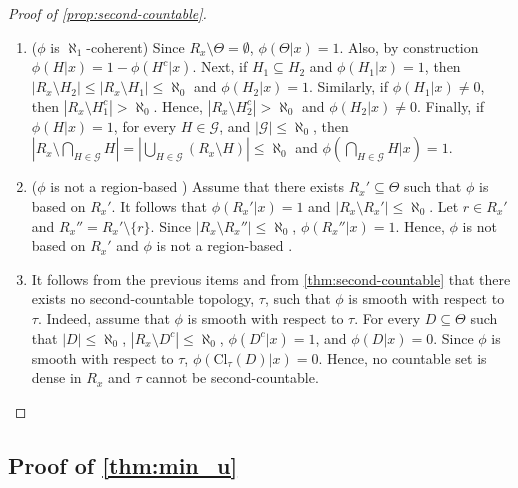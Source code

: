 \begin{proof}[Proof of \cref{prop:second-countable}]
 \begin{enumerate}
  \item ($\phi$ is $\aleph_1$-coherent) Since $R_x \setminus \Theta = \emptyset$, $\phi(\Theta|x) = 1$. Also, by construction $\phi(H|x) = 1 - \phi(H^c|x)$. Next, if $H_1 \subseteq H_2$ and $\phi(H_1|x) = 1$, then $|R_x \setminus H_2| \leq |R_x \setminus H_1| \leq \aleph_0$ and $\phi(H_2|x) = 1$. Similarly, if $\phi(H_1|x) \neq 0$, then $|R_x \setminus H_1^c| > \aleph_0$. Hence, $|R_x \setminus H_2^c| > \aleph_0$ and $\phi(H_2|x) \neq 0$. Finally, if $\phi(H|x) = 1$, for every $H \in \mathcal{G}$, and $|\mathcal{G}| \leq \aleph_0$, then $|R_x \setminus \bigcap_{H \in \mathcal{G}}H| = |\bigcup_{H \in \mathcal{G}}(R_x \setminus H)| \leq \aleph_0$ and $\phi(\bigcap_{H \in \mathcal{G}}H|x) = 1$.

  \item ($\phi$ is not a region-based \summ) Assume that there exists $R_x' \subseteq \Theta$ such that $\phi$ is based on $R_x'$. It follows that $\phi(R_x'|x) = 1$ and $|R_x \setminus R_x'| \leq \aleph_0$. Let $r \in R_x'$ and $R_x'' = R_x' \setminus \{r\}$. Since $|R_x \setminus R_x''| \leq \aleph_0$, $\phi(R_x''|x) = 1$. Hence, $\phi$ is not based on $R_x'$ and $\phi$ is not a region-based \summ.
  
  \item It follows from the previous items and from \cref{thm:second-countable} that there exists no second-countable topology, $\tau$, such that $\phi$ is smooth with respect to $\tau$. Indeed, assume that $\phi$ is smooth with respect to $\tau$. For every $D \subseteq \Theta$ such that $|D| \leq \aleph_0$, $|R_x \setminus D^c| \leq \aleph_0$, $\phi(D^c|x) = 1$, and $\phi(D|x) = 0$. Since $\phi$ is smooth with respect to $\tau$, $\phi(\text{Cl}_\tau(D)|x) = 0$. Hence, no countable set is dense in $R_x$ and $\tau$ cannot be second-countable. 
 \end{enumerate}
\end{proof}

\subsection{Proof of \cref{thm:min_u}}

